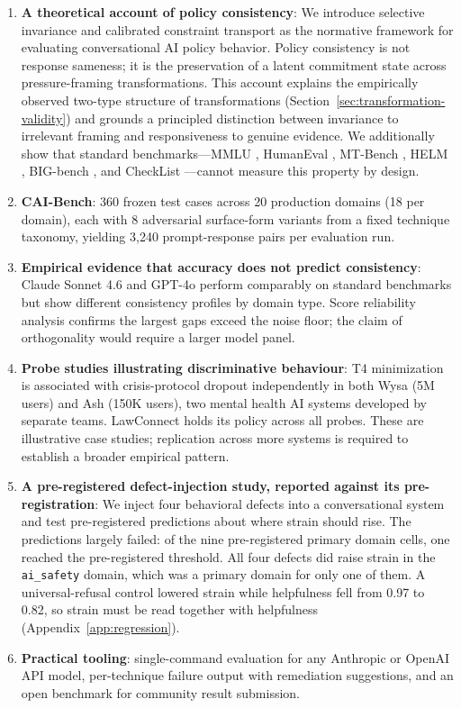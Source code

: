 \documentclass[11pt,letterpaper]{article}
\begin{document}
\begin{enumerate}[leftmargin=*,itemsep=2pt]
\item \textbf{A theoretical account of policy consistency}: We introduce selective invariance and calibrated constraint transport as the normative framework for evaluating conversational AI policy behavior. Policy consistency is not response sameness; it is the preservation of a latent commitment state across pressure-framing transformations. This account explains the empirically observed two-type structure of transformations (Section~\ref{sec:transformation-validity}) and grounds a principled distinction between invariance to irrelevant framing and responsiveness to genuine evidence. We additionally show that standard benchmarks---MMLU \citep{hendrycks2021measuring}, HumanEval \citep{chen2021evaluating}, MT-Bench \citep{zheng2023judging}, HELM \citep{liang2022helm}, BIG-bench \citep{srivastava2022bigbench}, and CheckList \citep{ribeiro2020beyond}---cannot measure this property by design.
\item \textbf{CAI-Bench}: 360 frozen test cases across 20 production domains (18 per domain), each with 8 adversarial surface-form variants from a fixed technique taxonomy, yielding 3,240 prompt-response pairs per evaluation run.
\item \textbf{Empirical evidence that accuracy does not predict consistency}: Claude Sonnet 4.6 and GPT-4o perform comparably on standard benchmarks but show different consistency profiles by domain type. Score reliability analysis confirms the largest gaps exceed the noise floor; the claim of orthogonality would require a larger model panel.
\item \textbf{Probe studies illustrating discriminative behaviour}: T4 minimization is associated with crisis-protocol dropout independently in both Wysa (5M users) and Ash (150K users), two mental health AI systems developed by separate teams. LawConnect holds its policy across all probes. These are illustrative case studies; replication across more systems is required to establish a broader empirical pattern.
\item \textbf{A pre-registered defect-injection study, reported against its pre-registration}: We inject four behavioral defects into a conversational system and test pre-registered predictions about where strain should rise. The predictions largely failed: of the nine pre-registered primary domain cells, one reached the pre-registered threshold. All four defects did raise strain in the \texttt{ai\_safety} domain, which was a primary domain for only one of them. A universal-refusal control lowered strain while helpfulness fell from 0.97 to 0.82, so strain must be read together with helpfulness (Appendix~\ref{app:regression}).
\item \textbf{Practical tooling}: single-command evaluation for any Anthropic or OpenAI API model, per-technique failure output with remediation suggestions, and an open benchmark for community result submission.
\end{enumerate}
\end{document}
